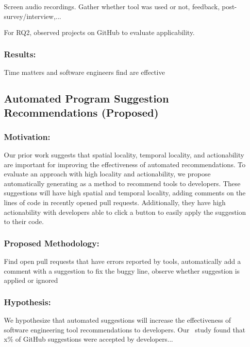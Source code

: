 Screen audio recordings. Gather whether tool was used or not, feedback, post-survey/interview,...

For RQ2, observed projects on GitHub to evaluate applicability.

\subsubsection{Results:} 

Time matters and software engineers find \timing are effective

\subsection{Automated Program Suggestion Recommendations (Proposed)}

\subsubsection{Motivation:} 

Our prior work suggests that spatial locality, temporal locality, and actionability are important for improving the effectiveness of automated recommendations. To evaluate an approach with high locality and actionability, we propose automatically generating \SUGGS as a method to recommend tools to developers. These suggestions will have high spatial and temporal locality, adding comments on the lines of code in recently opened pull requests. Additionally, they have high actionability with developers able to click a button to easily apply the suggestion to their code.

\subsubsection{Proposed Methodology:}

Find open pull requests that have errors reported by tools, automatically add a comment with a suggestion to fix the buggy line, observe whether suggestion is applied or ignored

\subsubsection{Hypothesis:}

We hypothesize that automated suggestions will increase the effectiveness of software engineering tool recommendations to developers. Our \sugg~study found that x\% of GitHub suggestions were accepted by developers...

